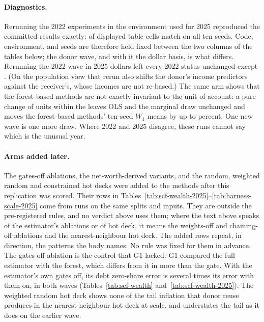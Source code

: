 \paragraph{Diagnostics.} Rerunning the 2022 experiments in the environment
used for 2025 reproduced the committed results exactly:
 of  displayed table cells match on all
ten seeds. Code, environment, and seeds are therefore held fixed between the
two columns of the tables below; the donor wave, and with it the dollar
basis, is what differs. Rerunning the 2022 wave in 2025 dollars left every
2022 status unchanged except . (On the population
view that rerun also shifts the donor's income predictors against the
receiver's, whose incomes are not re-based.) The same arm shows that the forest-based
methods are not exactly invariant to the unit of account: a pure change of
units within the \scf{} leaves OLS and the marginal draw unchanged and moves
the forest-based methods' ten-seed $W_1$ means by up to
 percent. One new wave is one more draw. Where 2022 and
2025 disagree, these runs cannot say which is the unusual year.

\paragraph{Arms added later.} The gates-off ablations, the
net-worth-derived variants, and the random, weighted random and constrained
hot decks were added to the methods after this replication was scored. Their
rows in Tables~\ref{tab:scf-wealth-2025}--\ref{tab:harness-scale-2025} come
from runs on the same splits and inputs. They are outside the pre-registered
rules, and no verdict above uses them; where the text above speaks of the
estimator's ablations or of hot deck, it means the weights-off and
chaining-off ablations and the nearest-neighbour hot deck. The added rows
repeat, in direction, the patterns the body names. No rule was fixed for
them in advance. The gates-off ablation is the
control that G1 lacked: G1 compared the full estimator with the
\microimpute{} forest, which differs from it in more than the gate. With the
estimator's own gates off, its debt zero-share error is several times its
error with them on, in both waves (Tables~\ref{tab:scf-wealth}
and~\ref{tab:scf-wealth-2025}). The weighted random hot deck shows none of
the tail inflation that donor reuse produces in the nearest-neighbour hot
deck at scale, and understates the tail as it does on the earlier wave.

